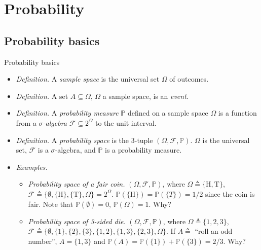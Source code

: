 \documentclass{beamer}
\numberwithin{equation}{section}
\begin{document}
\section{Probability}

\subsection{Probability basics}

\begin{frame}{Probability basics}
    \begin{itemize}
        \item
        \textit{Definition.} A \textit{sample space} is the universal set
        $ \Omega $ of outcomes.

        \item
        \textit{Definition.} A set $ A \subseteq \Omega $, $ \Omega $ a sample
        space, is an \textit{event}.

        \item
        \textit{Definition.} A \textit{probability measure} $ \mathbb{P} $
        defined on a sample space $ \Omega $ is a function from a
        $ \sigma $\textit{-algebra} $ \mathcal{F} \subseteq 2^\Omega $ to the
        unit interval.

        \item
        \textit{Definition.} A \textit{probability space} is the 3-tuple
        $ (\Omega, \mathcal{F}, \mathbb{P}) $. $ \Omega $ is the universal set,
        $ \mathcal{F} $ is a $ \sigma $-algebra, and $ \mathbb{P} $ is a
        probability measure.

        \item
        \textit{Examples.}
        \begin{itemize}
            \item
            \textit{Probability space of a fair coin.}
            $ (\Omega, \mathcal{F}, \mathbb{P}) $, where $ \Omega \triangleq
            \{\text{H}, \text{T}\} $, $ \mathcal{F} \triangleq \{\emptyset,
            \{\text{H}\}, \{\text{T}\}, \Omega\} = 2^\Omega $.
            $ \mathbb{P}(\{\text{H}\}) = \mathbb{P}(\{T\}) = 1 / 2 $ since the
            coin is fair. Note that $ \mathbb{P}(\emptyset) = 0 $,
            $ \mathbb{P}(\Omega) = 1 $. Why?

            \item
            \textit{Probability space of 3-sided die.} $ (\Omega, \mathcal{F},
            \mathbb{P}) $, where $ \Omega \triangleq \{1, 2, 3\} $,
            $ \mathcal{F} \triangleq \{\emptyset, \{1\}, \{2\}, \{3\},
            \{1, 2\}, \{1, 3\}, \{2, 3\}, \Omega\} $. If $ A \triangleq $
            ``roll an odd number'', $ A = \{1, 3\} $ and
            $ \mathbb{P}(A) = \mathbb{P}(\{1\}) + \mathbb{P}(\{3\}) = 2 / 3 $.
            Why?
        \end{itemize}
    \end{itemize}
\end{frame}
\end{document}
